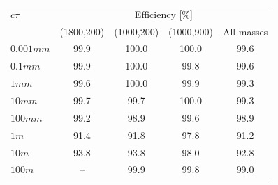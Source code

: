 \begin{table}[h!]
\centering
  \begin{tabular}{lcccc} 
    \hline
    $c\tau$          & \multicolumn{4}{c}{Efficiency [\%]}               \\
    \cline{2-5}
                     & (1800,200) & (1000,200) & (1000,900) & All masses \\
    \hline
    $0.001\unit{mm}$ & 99.9       & 100.0      & 100.0      & 99.6       \\
    $0.1\unit{mm}$   & 99.9       & 100.0      & 99.8       & 99.6       \\
    $1\unit{mm}$     & 99.6       & 100.0      & 99.9       & 99.3       \\
    $10\unit{mm}$    & 99.7       & 99.7       & 100.0      & 99.3       \\
    $100\unit{mm}$   & 99.2       & 98.9       & 99.6       & 98.9       \\
    $1\unit{m}$      & 91.4       & 91.8       & 97.8       & 91.2       \\
    $10\unit{m}$     & 93.8       & 93.8       & 98.0       & 92.8       \\
    $100\unit{m}$    & --         & 99.9       & 99.8       & 99.0       \\
    \hline
  \end{tabular}
  \label{tab:LLP-oddjetveto}
\end{table}

